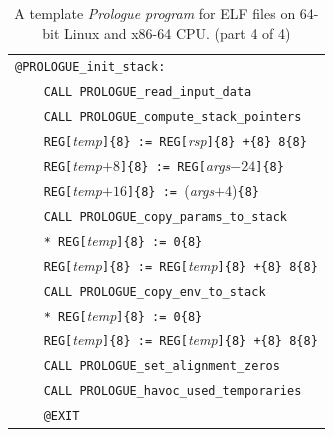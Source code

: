\documentclass[10pt,twocolumn]{article}
\begin{document}
\begin{table}[!h]
\begin{center}
\begin{tabular}{l}
\texttt{@PROLOGUE\_init\_stack:}\\ %
\texttt{~~~~CALL PROLOGUE\_read\_input\_data}\\ %
\texttt{~~~~CALL PROLOGUE\_compute\_stack\_pointers}\\ %
\texttt{~~~~REG[}\textit{temp}\texttt{]\{8\} := REG[}\textit{rsp}\texttt{]\{8\}
+\{8\} 8\{8\}}\\ %
\texttt{~~~~REG[}\textit{temp}$ +8 $\texttt{]\{8\} := REG[}\textit{args}$ -24
$\texttt{]\{8\}}\\ %
\texttt{~~~~REG[}\textit{temp}$ +16 $\texttt{]\{8\} := }(\textit{args}$ +4
$)\texttt{\{8\}}\\ %
\texttt{~~~~CALL PROLOGUE\_copy\_params\_to\_stack}\\ %
\texttt{~~~~* REG[}\textit{temp}\texttt{]\{8\} := 0\{8\} }\\ %
\texttt{~~~~REG[}\textit{temp}\texttt{]\{8\} := REG[}\textit{temp}\texttt{]\{8\}
+\{8\} 8\{8\}}\\ %
\texttt{~~~~CALL PROLOGUE\_copy\_env\_to\_stack}\\ %
\texttt{~~~~* REG[}\textit{temp}\texttt{]\{8\} := 0\{8\} }\\ %
\texttt{~~~~REG[}\textit{temp}\texttt{]\{8\} := REG[}\textit{temp}\texttt{]\{8\}
+\{8\} 8\{8\}}\\ %
\texttt{~~~~CALL PROLOGUE\_set\_alignment\_zeros}\\ %
\texttt{~~~~CALL PROLOGUE\_havoc\_used\_temporaries}\\ %
\texttt{~~~~@EXIT}\\ %

\end{tabular}
\end{center}
\caption{A template \emph{Prologue program} for ELF files on 64-bit Linux and
x86-64 CPU. (part 4 of 4)} %
\label{tab:prologue:x86_64_Linux:end}
\end{table}
\end{document}
